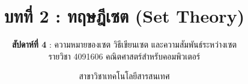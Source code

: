 
\renewcommand{\footchaptertitle}{บทที่ 2 ทฤษฎีเซต (สัปดาห์ที่ 4)}

\title{\textbf{บทที่ 2 : ทฤษฎีเซต (Set Theory)}}
\subtitle{\textbf{สัปดาห์ที่ 4} : ความหมายของเซต วิธีเขียนเซต และความสัมพันธ์ระหว่างเซต \\ รายวิชา 4091606 คณิตศาสตร์สำหรับคอมพิวเตอร์}
\author{สาขาวิชาเทคโนโลยีสารสนเทศ}
\date{}




